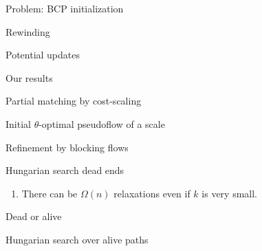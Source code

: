 \documentclass[xcolor={dvipsnames,usenames}]{beamer}
\newcommand{\eps}{\varepsilon}
\begin{document}
\begin{frame}{Problem: BCP initialization}
\end{frame}

\begin{frame}{Rewinding}
\end{frame}

\begin{frame}{Potential updates}
\end{frame}


\begin{frame}{Our results}
\end{frame}

\begin{frame}{Partial matching by cost-scaling}
\end{frame}

\begin{frame}{Initial $\theta$-optimal pseudoflow of a scale}
\end{frame}

\begin{frame}{Refinement by blocking flows}
\end{frame}

\begin{frame}{Hungarian search dead ends}
\begin{enumerate}
\item There can be $\Omega(n)$ relaxations even if $k$ is very small.
\end{enumerate}
\end{frame}

\begin{frame}{Dead or alive}
\end{frame}

\begin{frame}{Hungarian search over alive paths}
\end{frame}
\end{document}
